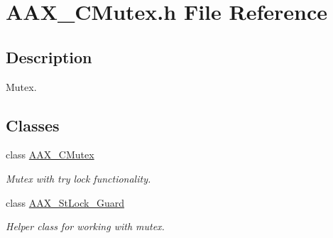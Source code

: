 \hypertarget{a00443}{}\section{A\+A\+X\+\_\+\+C\+Mutex.\+h File Reference}
\label{a00443}


\subsection{Description}
Mutex. 

\subsection*{Classes}
\begin{DoxyCompactItemize}
\item 
class \mbox{\hyperlink{a01501}{A\+A\+X\+\_\+\+C\+Mutex}}
\begin{DoxyCompactList}\small\item\em Mutex with try lock functionality. \end{DoxyCompactList}\item 
class \mbox{\hyperlink{a01505}{A\+A\+X\+\_\+\+St\+Lock\+\_\+\+Guard}}
\begin{DoxyCompactList}\small\item\em Helper class for working with mutex. \end{DoxyCompactList}\end{DoxyCompactItemize}
